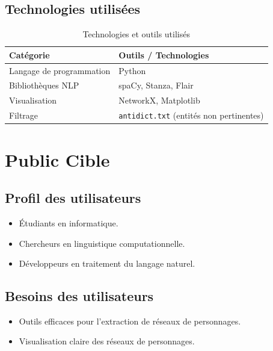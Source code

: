 \documentclass[12pt,a4paper]{article}
\begin{document}
\subsection{Technologies utilisées}

\begin{table}[h!]
\centering
\begin{tabular}{@{}ll@{}}
\toprule
\textbf{Catégorie} & \textbf{Outils / Technologies} \\
\midrule
Langage de programmation & Python \\
Bibliothèques NLP & spaCy, Stanza, Flair \\
Visualisation & NetworkX, Matplotlib \\
Filtrage & \texttt{antidict.txt} (entités non pertinentes) \\
\bottomrule
\end{tabular}
\caption{Technologies et outils utilisés}
\end{table}

\section{Public Cible}

\subsection{Profil des utilisateurs}

\begin{itemize}
    \item Étudiants en informatique.
    \item Chercheurs en linguistique computationnelle.
    \item Développeurs en traitement du langage naturel.
\end{itemize}

\subsection{Besoins des utilisateurs}

\begin{itemize}
    \item Outils efficaces pour l'extraction de réseaux de personnages.
    \item Visualisation claire des réseaux de personnages.
\end{itemize}
\end{document}
